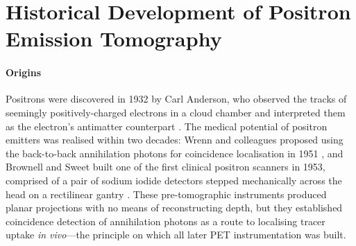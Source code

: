 \section{Historical Development of Positron Emission Tomography}

\paragraph{Origins}
Positrons were discovered in 1932 by Carl Anderson, who observed the tracks of seemingly positively-charged electrons in a cloud chamber and interpreted them as the electron's antimatter counterpart \cite{Anderson1933}.
The medical potential of positron emitters was realised within two decades: Wrenn and colleagues proposed using the back-to-back annihilation photons for coincidence localisation in 1951 \cite{Wrenn1951}, and Brownell and Sweet built one of the first clinical positron scanners in 1953, comprised of a pair of sodium iodide detectors stepped mechanically across the head on a rectilinear gantry \cite{Sweet1953}.
These pre-tomographic instruments produced planar projections with no means of reconstructing depth, but they established coincidence detection of annihilation photons as a route to localising tracer uptake \emph{in vivo}---the principle on which all later PET instrumentation was built.


